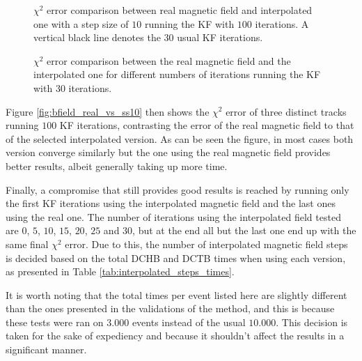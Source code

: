     \begin{figure}[ht]
        \begin{floatrow}
                {\caption{\label{fig:bfield_real_vs_ss10} $\chi^2$ error comparison between real magnetic field and interpolated one with a step size of $10$ running the KF with $100$ iterations. A vertical black line denotes the $30$ usual KF iterations.}}
                
                {\caption{\label{fig:bfield_real_vs_ni20} $\chi^2$ error comparison between the real magnetic field and the interpolated one for different numbers of iterations running the KF with $30$ iterations.}}
        \end{floatrow}
    \end{figure}

Figure \ref{fig:bfield_real_vs_ss10} then shows the $\chi^2$ error of three distinct tracks running $100$ KF iterations, contrasting the error of the real magnetic field to that of the selected interpolated version.
As can be seen the figure, in most cases both version converge similarly but the one using the real magnetic field provides better results, albeit generally taking up more time.

Finally, a compromise that still provides good results is reached by running only the first KF iterations using the interpolated magnetic field and the last ones using the real one.
The number of iterations using the interpolated field tested are $0$, $5$, $10$, $15$, $20$, $25$ and $30$, but at the end all but the last one end up with the same final $\chi^2$ error.
Due to this, the number of interpolated magnetic field steps is decided based on the total DCHB and DCTB times when using each version, as presented in Table \ref{tab:interpolated_steps_times}.

It is worth noting that the total times per event listed here are slightly different than the ones presented in the validations of the method, and this is because these tests were ran on $3.000$ events instead of the usual $10.000$.
This decision is taken for the sake of expediency and because it shouldn't affect the results in a significant manner.

